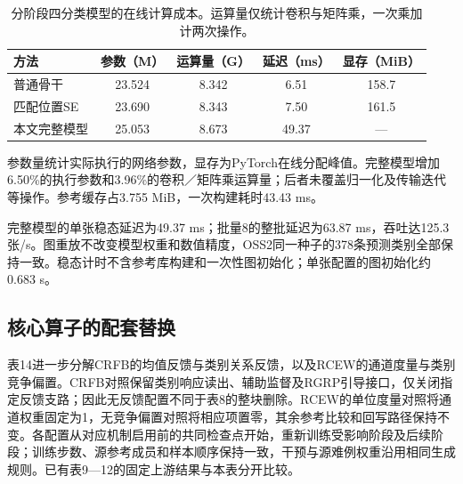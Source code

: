 \documentclass[journal,10pt,a4paper]{IEEEtran}
\begin{document}
\begin{table}[H]
\centering\footnotesize
\setcounter{table}{12}
\caption{分阶段四分类模型的在线计算成本。运算量仅统计卷积与矩阵乘，一次乘加计两次操作。}
\label{tab:13}
\setlength{\tabcolsep}{3pt}\renewcommand{\arraystretch}{1.2}
\begin{tabularx}{\linewidth}{LCCCC}
\toprule
方法 & 参数（M） & 运算量（G） & 延迟（ms） & 显存（MiB） \\
\midrule
普通骨干 & 23.524 & 8.342 & 6.51 & 158.7 \\
匹配位置SE & 23.690 & 8.343 & 7.50 & 161.5 \\
本文完整模型 & 25.053 & 8.673 & 49.37 & --- \\
\bottomrule
\end{tabularx}
\end{table}

参数量统计实际执行的网络参数，显存为PyTorch在线分配峰值。完整模型增加6.50\%的执行参数和3.96\%的卷积／矩阵乘运算量；后者未覆盖归一化及传输迭代等操作。参考缓存占3.755 MiB，一次构建耗时43.43 ms。

完整模型的单张稳态延迟为49.37 ms；批量8的整批延迟为63.87 ms，吞吐达125.3张/s。图重放不改变模型权重和数值精度，OSS2同一种子的378条预测类别全部保持一致。稳态计时不含参考库构建和一次性图初始化；单张配置的图初始化约0.683 s。

\subsection{核心算子的配套替换}\label{ux6838ux5fc3ux7b97ux5b50ux7684ux914dux5957ux66ffux6362}

表14进一步分解CRFB的均值反馈与类别关系反馈，以及RCEW的通道度量与类别竞争偏置。CRFB对照保留类别响应读出、辅助监督及RGRP引导接口，仅关闭指定反馈支路；因此无反馈配置不同于表8的整块删除。RCEW的单位度量对照将通道权重固定为1，无竞争偏置对照将相应项置零，其余参考比较和回写路径保持不变。各配置从对应机制启用前的共同检查点开始，重新训练受影响阶段及后续阶段；训练步数、源参考成员和样本顺序保持一致，干预与源难例权重沿用相同生成规则。已有表9---12的固定上游结果与本表分开比较。
\end{document}
